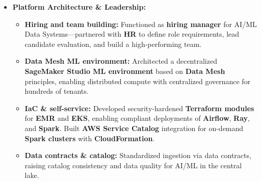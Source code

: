 \begin{itemize}[leftmargin=1.25em, topsep=1pt, partopsep=1.5pt]
\item \textbf{Platform Architecture \& Leadership:}
    \begin{itemize}[leftmargin=2.25em]
        \setlength\itemsep{0.2em}
        \item \textbf{Hiring and team building:} Functioned as \textbf{hiring manager} for AI/ML Data Systems—partnered with \textbf{HR} to define role requirements, lead candidate evaluation, and build a high-performing team.
        \item \textbf{Data Mesh ML environment:} Architected a decentralized \textbf{SageMaker Studio ML environment} based on \textbf{Data Mesh} principles, enabling distributed compute with centralized governance for hundreds of tenants.
        \item \textbf{IaC \& self-service:} Developed security-hardened \textbf{Terraform modules} for \textbf{EMR} and \textbf{EKS}, enabling compliant deployments of \textbf{Airflow}, \textbf{Ray}, and \textbf{Spark}. Built \textbf{AWS Service Catalog} integration for on-demand \textbf{Spark clusters} with \textbf{CloudFormation}.
        \item \textbf{Data contracts \& catalog:} Standardized ingestion via data contracts, raising catalog consistency and data quality for AI/ML in the central lake.
    \end{itemize}

\end{itemize}
